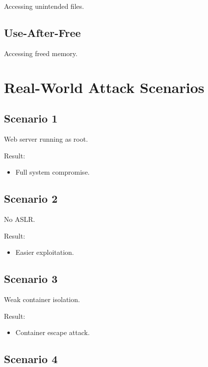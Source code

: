 Accessing unintended files.

\subsection{Use-After-Free}

Accessing freed memory.

\section{Real-World Attack Scenarios}

\subsection{Scenario 1}

Web server running as root.

Result:

\begin{itemize}
\item Full system compromise.
\end{itemize}

\subsection{Scenario 2}

No ASLR.

Result:

\begin{itemize}
\item Easier exploitation.
\end{itemize}

\subsection{Scenario 3}

Weak container isolation.

Result:

\begin{itemize}
\item Container escape attack.
\end{itemize}

\subsection{Scenario 4}

